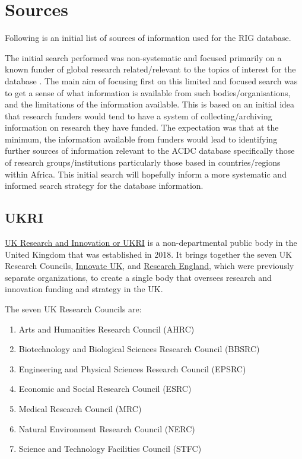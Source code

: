 \documentclass[
]{book}
\providecommand{\tightlist}{%
  \setlength{\itemsep}{0pt}\setlength{\parskip}{0pt}}
\begin{document}
\hypertarget{sources}{%
\chapter{Sources}\label{sources}}

Following is an initial list of sources of information used for the RIG database.

The initial search performed was non-systematic and focused primarily on a known funder of global research related/relevant to the topics of interest for the database . The main aim of focusing first on this limited and focused search was to get a sense of what information is available from such bodies/organisations, and the limitations of the information available. This is based on an initial idea that research funders would tend to have a system of collecting/archiving information on research they have funded. The expectation was that at the minimum, the information available from funders would lead to identifying further sources of information relevant to the ACDC database specifically those of research groups/institutions particularly those based in countries/regions within Africa. This initial search will hopefully inform a more systematic and informed search strategy for the database information.

\hypertarget{ukri}{%
\section{UKRI}\label{ukri}}

\href{https://www.ukri.org/}{UK Research and Innovation or UKRI} is a non-departmental public body in the United Kingdom that was established in 2018. It brings together the seven UK Research Councils, \href{https://www.ukri.org/councils/innovate-uk/}{Innovate UK}, and \href{https://www.ukri.org/councils/research-england/}{Research England}, which were previously separate organizations, to create a single body that oversees research and innovation funding and strategy in the UK.

The seven UK Research Councils are:

\begin{enumerate}
\def\labelenumi{\arabic{enumi}.}
\tightlist
\item
  Arts and Humanities Research Council (AHRC)
\item
  Biotechnology and Biological Sciences Research Council (BBSRC)
\item
  Engineering and Physical Sciences Research Council (EPSRC)
\item
  Economic and Social Research Council (ESRC)
\item
  Medical Research Council (MRC)
\item
  Natural Environment Research Council (NERC)
\item
  Science and Technology Facilities Council (STFC)
\end{enumerate}
\end{document}
